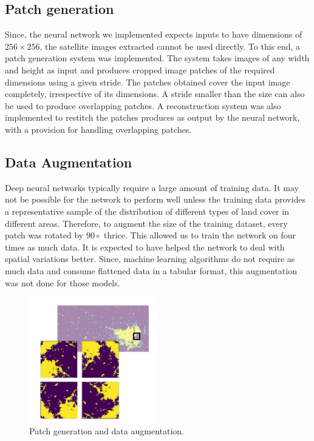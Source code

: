 \documentclass[12pt, a4paper]{report}
\begin{document}
\subsection{Patch generation}
Since, the neural network we implemented expects inputs to have dimensions of $256 \times 256$, the satellite images extracted cannot be used directly. To this end, a patch generation system was implemented. The system takes images of any width and height as input and produces cropped image patches of the required dimensions using a given stride. The patches obtained cover the input image completely, irrespective of its dimensions. A stride smaller than the size can also be used to produce overlapping patches. A reconstruction system was also implemented to restitch the patches produces as output by the neural network, with a provision for handling overlapping patches.
\subsection{Data Augmentation}
Deep neural networks typically require a large amount of training data. It may not be possible for the network to perform well unless the training data provides a representative sample of the distribution of different types of land cover in different areas. Therefore, to augment the size of the training dataset, every patch was rotated by $90\circ$ thrice. This allowed us to train the network on four times as much data. It is expected to have helped the network to deal with spatial variations better. Since, machine learning algorithms do not require as much data and consume flattened data in a tabular format, this augmentation was not done for those models.
\begin{figure}[h]
\centering
\includegraphics[width=0.5\textwidth]{dataaug.jpg}
\caption{Patch generation and data augmentation.}
\end{figure}
\end{document}
